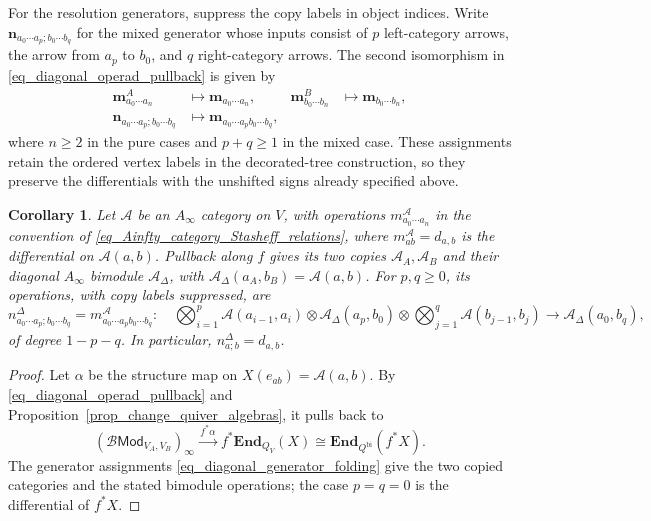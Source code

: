 \documentclass[11pt,letterpaper]{article}
\numberwithin{equation}{section}
\theoremstyle{plain}
\newtheorem{cor}[thm]{Corollary}
\theoremstyle{definition}
\theoremstyle{remark}
\begin{document}
For the resolution generators, suppress the copy labels in object
indices. Write $\mathbf n_{a_0\cdots a_p;b_0\cdots b_q}$ for the
mixed generator whose inputs consist of $p$ left-category arrows,
the arrow from $a_p$ to $b_0$, and $q$ right-category arrows.
The second isomorphism in \eqref{eq_diagonal_operad_pullback} is
given by
\begin{equation}\label{eq_diagonal_generator_folding}
\begin{aligned}
 \mathbf m^A_{a_0\cdots a_n}&\longmapsto
 \mathbf m_{a_0\cdots a_n},
 &\mathbf m^B_{b_0\cdots b_n}&\longmapsto
 \mathbf m_{b_0\cdots b_n},\\
 \mathbf n_{a_0\cdots a_p;b_0\cdots b_q}
 &\longmapsto \mathbf m_{a_0\cdots a_p b_0\cdots b_q},
\end{aligned}
\end{equation}
where $n\geq2$ in the pure cases and $p+q\geq1$ in the mixed case.
These assignments retain the ordered vertex labels in the
decorated-tree construction, so they preserve the differentials
with the unshifted signs already specified above.

\begin{cor}\label{cor_diagonal_Ainfinity_bimodule}
Let $\mathcal A$ be an $A_\infty$ category on $V$, with operations
$m^{\mathcal A}_{a_0\cdots a_n}$ in the convention of
\eqref{eq_Ainfty_category_Stasheff_relations}, where
$m^{\mathcal A}_{ab}=d_{a,b}$ is the differential on
$\mathcal A(a,b)$. Pullback along $f$ gives its two copies
$\mathcal A_A,\mathcal A_B$ and their diagonal $A_\infty$ bimodule
$\mathcal A_\Delta$, with $\mathcal A_\Delta(a_A,b_B)=\mathcal A(a,b)$.
For $p,q\geq0$, its operations, with copy labels suppressed, are
\begin{equation}\label{eq_diagonal_bimodule_operations}
 n^\Delta_{a_0\cdots a_p;b_0\cdots b_q}
 =m^{\mathcal A}_{a_0\cdots a_p b_0\cdots b_q}: \quad 
 \bigotimes_{i=1}^{p}\mathcal A(a_{i-1},a_i)
 \otimes\mathcal A_\Delta(a_p,b_0)
 \otimes\bigotimes_{j=1}^{q}\mathcal A(b_{j-1},b_j)
 \longrightarrow\mathcal A_\Delta(a_0,b_q), \quad 
\end{equation}
of degree $1-p-q$. In particular, $n^\Delta_{a;b}=d_{a,b}$.
\end{cor}
\begin{proof}
Let $\alpha$ be the structure map on $X(e_{ab})=\mathcal A(a,b)$.
By \eqref{eq_diagonal_operad_pullback} and
Proposition~\ref{prop_change_quiver_algebras}, it pulls back to
\[
 (\mathscr B\mathsf{Mod}_{V_A,V_B})_\infty
 \xrightarrow{\,f^*\alpha\,} f^*\mathbf{End}_{Q_V}(X)
 \cong\mathbf{End}_{Q^{\mathrm{bi}}}(f^*X).
\]
The generator assignments \eqref{eq_diagonal_generator_folding}
give the two copied categories and the stated bimodule operations;
the case $p=q=0$ is the differential of $f^*X$.
\end{proof}
\end{document}
